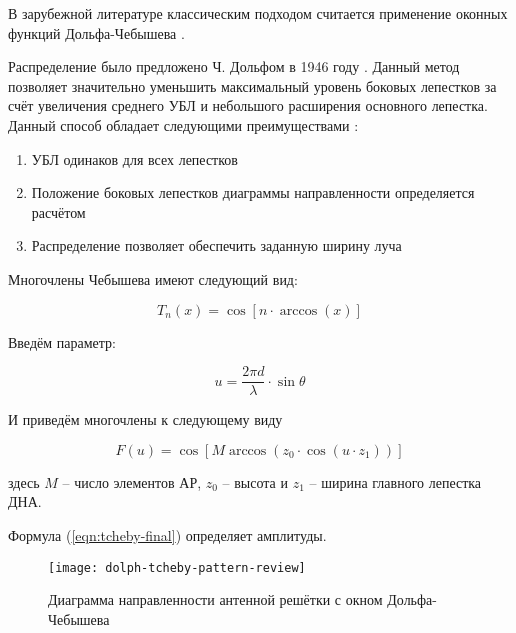В зарубежной литературе классическим подходом считается применение оконных функций Дольфа-Чебышева
\cite{andreasen1962linear, harrington1961sidelobe, jain2012solving, luo2015synthesis, subbarao2015tapering, ishimaru1962theory}.

Распределение было предложено Ч. Дольфом в 1946 году \cite{dolph1946current}.
Данный метод позволяет значительно уменьшить максимальный уровень боковых
лепестков за счёт увеличения среднего УБЛ и небольшого расширения
основного лепестка. Данный способ обладает следующими преимуществами \cite{vendik2018antenna}:

\begin{enumerate}
    \item УБЛ одинаков для всех лепестков
    \item Положение боковых лепестков диаграммы направленности определяется расчётом
    \item Распределение позволяет обеспечить заданную ширину луча
\end{enumerate}

Многочлены Чебышева имеют следующий вид:

\begin{equation*}
    T_n(x)=\cos{\left[n \cdot \arccos{(x)}\right]}
\end{equation*}

Введём параметр:

\begin{equation*}
    u=\frac{2\pi d}{\lambda}\cdot \sin{\theta}
\end{equation*}

И приведём многочлены к следующему виду

\begin{equation}\label{eqn:tcheby-final}
    F(u)=\cos{\left[M\arccos{(z_0 \cdot \cos{(u\cdot z_1)})}\right]}
\end{equation}

здесь $M$ -- число элементов АР, $z_0$ -- высота и $z_1$ -- ширина главного лепестка ДНА.

Формула (\ref{eqn:tcheby-final}) определяет амплитуды.

\begin{figure}[H]
    \centering
    \texttt{[image: dolph-tcheby-pattern-review]}
    \caption{Диаграмма направленности антенной решётки с окном Дольфа-Чебышева \cite{vendik2018antenna}}%
    \label{fig:dolph-tcheby-pattern-review}
\end{figure}

